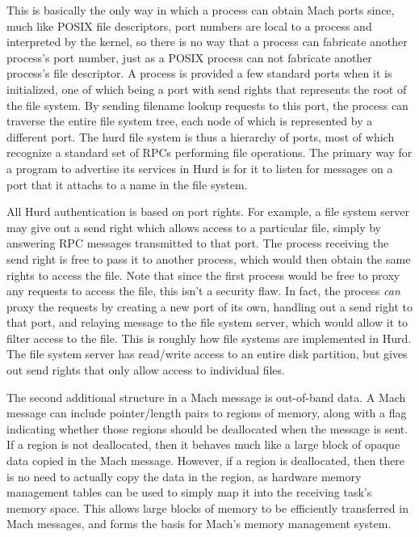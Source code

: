 \documentclass{article}
\begin{document}
This is basically the only way in which a process can obtain Mach
ports since, much like POSIX file descriptors, port numbers are local
to a process and interpreted by the kernel, so there is no way that a
process can fabricate another process's port number, just as a POSIX
process can not fabricate another process's file descriptor.  A
process is provided a few standard ports when it is initialized, one
of which being a port with send rights that represents the root of the
file system.  By sending filename lookup requests to this port, the
process can traverse the entire file system tree, each node of which
is represented by a different port.  The hurd file system is thus a
hierarchy of ports, most of which recognize a standard set of RPCs
performing file operations.  The primary way for a program to
advertise its services in Hurd is for it to listen for messages on a
port that it attachs to a name in the file system.

All Hurd authentication is based on port rights.  For example, a file
system server may give out a send right which allows access to a
particular file, simply by answering RPC messages transmitted to that
port.  The process receiving the send right is free to pass it to
another process, which would then obtain the same rights to access the
file.  Note that since the first process would be free to proxy any
requests to access the file, this isn't a security flaw.  In fact, the
process {\it can} proxy the requests by creating a new port of its
own, handling out a send right to that port, and relaying message to
the file system server, which would allow it to filter access to the
file.  This is roughly how file systems are implemented in Hurd.  The
file system server has read/write access to an entire disk partition,
but gives out send rights that only allow access to individual files.

The second additional structure in a Mach message is out-of-band data.
A Mach message can include pointer/length pairs to regions of memory,
along with a flag indicating whether those regions should be
deallocated when the message is sent.  If a region is not deallocated,
then it behaves much like a large block of opaque data copied in the
Mach message.  However, if a region is deallocated, then there is no
need to actually copy the data in the region, as hardware memory
management tables can be used to simply map it into the receiving
task's memory space.  This allows large blocks of memory to be
efficiently transferred in Mach messages, and forms the basis for
Mach's memory management system.
\end{document}
